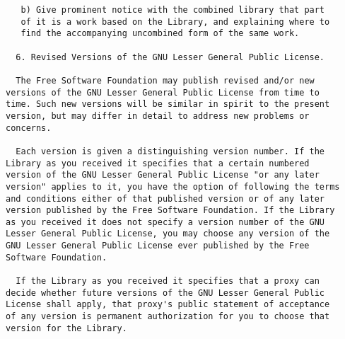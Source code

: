 \documentclass[11pt,twoside,fleqn,openright,titlepage]{cslreport}
\begin{document}
\begin{small}
\begin{verbatim}
   b) Give prominent notice with the combined library that part
   of it is a work based on the Library, and explaining where to
   find the accompanying uncombined form of the same work.

  6. Revised Versions of the GNU Lesser General Public License.

  The Free Software Foundation may publish revised and/or new
versions of the GNU Lesser General Public License from time to
time. Such new versions will be similar in spirit to the present
version, but may differ in detail to address new problems or
concerns.

  Each version is given a distinguishing version number. If the
Library as you received it specifies that a certain numbered
version of the GNU Lesser General Public License "or any later
version" applies to it, you have the option of following the terms
and conditions either of that published version or of any later
version published by the Free Software Foundation. If the Library
as you received it does not specify a version number of the GNU
Lesser General Public License, you may choose any version of the
GNU Lesser General Public License ever published by the Free
Software Foundation.

  If the Library as you received it specifies that a proxy can
decide whether future versions of the GNU Lesser General Public
License shall apply, that proxy's public statement of acceptance
of any version is permanent authorization for you to choose that
version for the Library.
\end{verbatim}
\end{small}
\end{document}
